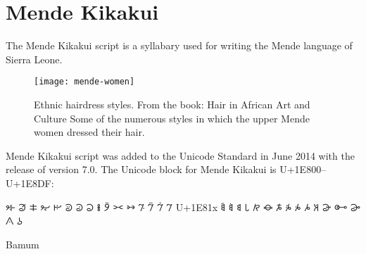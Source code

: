        
\chapter{Mende Kikakui}

\newfontfamily{}

The Mende Kikakui script is a syllabary used for writing the Mende language of Sierra Leone.

\begin{figure}[htbp]
\parindent=0pt
\centering

\texttt{[image: mende-women]}

\caption{Ethnic hairdress styles. From the book: Hair in African Art and Culture
Some of the numerous styles in which the upper Mende women dressed their hair.}
\end{figure}

Mende Kikakui script was added to the Unicode Standard in June 2014 with the release of version 7.0.
The Unicode block for Mende Kikakui is U+1E800–U+1E8DF:


\bgroup
\kikakui


𞠀	𞠁	𞠂	𞠃	𞠄	𞠅	𞠆	𞠇	𞠈	𞠉	𞠊	𞠋	𞠌	𞠍	𞠎	𞠏
U+1E81x	𞠐	𞠑	𞠒	𞠓	𞠔	𞠕	𞠖	𞠗	𞠘	𞠙	𞠚	𞠛	𞠜	𞠝	𞠞	𞠟

\egroup


\begin{scriptexample}[]{Bamum}
\end{scriptexample}